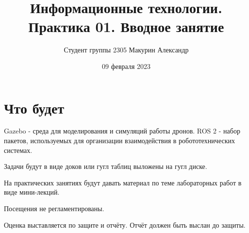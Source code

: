 \documentclass{article}
\title{Информационные технологии. Практика 01. Вводное занятие}
\author{Студент группы 2305 Макурин Александр}
\date{09 февраля 2023}
\begin{document}
\maketitle

\section{Что будет}
Gazebo - среда для моделирования и симуляций работы дронов. ROS 2 - набор пакетов, используемых для организации взаимодействия в робототехнических системах.

Задачи будут в виде доков или гугл таблиц выложены на гугл диске.

На практических занятиях будут давать материал по теме лабораторных работ в виде мини-лекций.

Посещения не регламентированы.

Оценка выставляется по защите и отчёту. Отчёт должен быть выслан до защиты.
\end{document}
